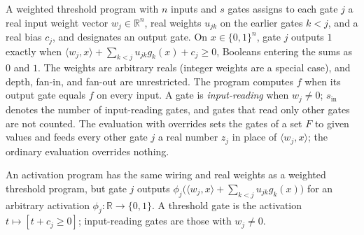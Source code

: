 \begin{definition}
  \label{def:lowerbounds-threshold-program}
  \leanok
  A weighted threshold program with $n$ inputs and $s$ gates assigns to each gate
  $j$ a real input weight vector $w_j\in\mathbb{R}^n$, real weights $u_{jk}$ on the
  earlier gates $k<j$, and a real bias $c_j$, and designates an output gate. On
  $x\in\{0,1\}^n$, gate $j$ outputs $1$ exactly when
  $\langle w_j,x\rangle+\sum_{k<j}u_{jk}g_k(x)+c_j\ge0$, Booleans entering the sums
  as $0$ and $1$. The weights are arbitrary reals (integer weights are a special
  case), and depth, fan-in, and fan-out are unrestricted. The program computes $f$
  when its output gate equals $f$ on every input. A gate is \emph{input-reading}
  when $w_j\ne0$; $s_{\mathrm{in}}$ denotes the number of input-reading gates, and
  gates that read only other gates are not counted. The evaluation with overrides
  sets the gates of a set $F$ to given values and feeds every other gate $j$ a real
  number $z_j$ in place of $\langle w_j,x\rangle$; the ordinary evaluation
  overrides nothing.
\end{definition}

\begin{definition}
  \label{def:lowerbounds-threshold-activation}
  \leanok
  An activation program has the same wiring and real weights as a weighted
  threshold program, but gate $j$ outputs
  $\phi_j\bigl(\langle w_j,x\rangle+\sum_{k<j}u_{jk}g_k(x)\bigr)$ for an arbitrary
  activation $\phi_j:\mathbb{R}\to\{0,1\}$. A threshold gate is the activation
  $t\mapsto[t+c_j\ge0]$; input-reading gates are those with $w_j\ne0$.
\end{definition}

